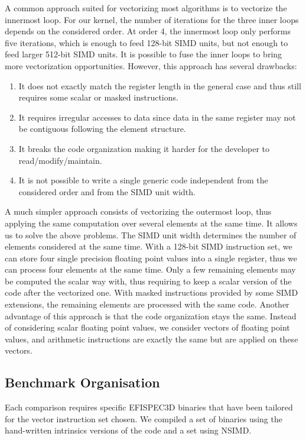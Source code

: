 \documentclass[a4paper,11pt]{article}
\newcommand{\efispec}{EFISPEC3D}
\newcommand{\nsimd}{NSIMD}
\begin{document}
A common approach suited for vectorizing most algorithms is to vectorize the
innermost loop.  For our kernel, the number of iterations for the three inner
loops depends on the considered order.  At order 4, the innermost loop only
performs five iterations, which is enough to feed 128-bit SIMD units, but not
enough to feed larger 512-bit SIMD units.  It is possible to fuse the inner
loops to bring more vectorization opportunities.  However, this approach has
several drawbacks:
\begin{enumerate}
  \item It does not exactly match the register length in the general case and
        thus still requires some scalar or masked instructions.
  \item It requires irregular accesses to data since data in the same register
        may not be contiguous following the element structure.
  \item It breaks the code organization making it harder for the developer to
        read/modify/maintain.
  \item It is not possible to write a single generic code independent from the
        considered order and from the SIMD unit width.
\end{enumerate}

A much simpler approach consists of vectorizing the outermost loop, thus
applying the same computation over several elements at the same time.  It
allows us to solve the above problems.  The SIMD unit width determines the
number of elements considered at the same time.  With a 128-bit SIMD
instruction set, we can store four single precision floating point values into
a single register, thus we can process four elements at the same time. Only a
few remaining elements may be computed the scalar way with, thus requiring to
keep a scalar version of the code after the vectorized one.  With masked
instructions provided by some SIMD extensions, the remaining elements are
processed with the same code.  Another advantage of this approach is that the
code organization stays the same.  Instead of considering scalar floating point
values, we consider vectors of floating point values, and arithmetic
instructions are exactly the same but are applied on these vectors.

\subsection{Benchmark Organisation}

Each comparison requires specific \efispec{} binaries that have been tailored
for the vector instruction set chosen. We compiled a set of binaries using the
hand-written intrinsics versions of the code and a set using \nsimd{}.
\end{document}
